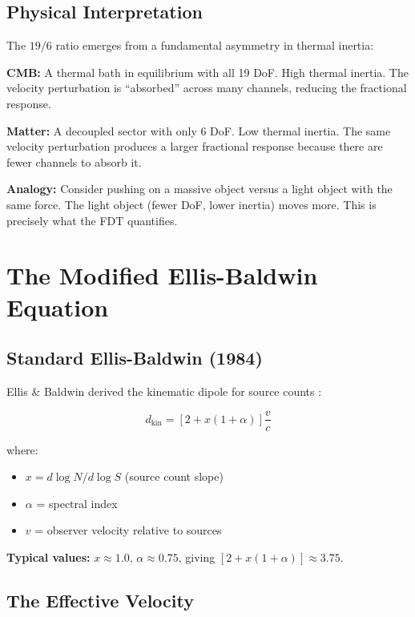 \documentclass[12pt,a4paper]{article}
\begin{document}
\subsection{Physical Interpretation}

The $19/6$ ratio emerges from a fundamental asymmetry in thermal inertia:

\textbf{CMB:} A thermal bath in equilibrium with all 19 DoF. High thermal inertia. The velocity perturbation is ``absorbed'' across many channels, reducing the fractional response.

\textbf{Matter:} A decoupled sector with only 6 DoF. Low thermal inertia. The same velocity perturbation produces a larger fractional response because there are fewer channels to absorb it.

\textbf{Analogy:} Consider pushing on a massive object versus a light object with the same force. The light object (fewer DoF, lower inertia) moves more. This is precisely what the FDT quantifies.

\section{The Modified Ellis-Baldwin Equation}

\subsection{Standard Ellis-Baldwin (1984)}

Ellis \& Baldwin derived the kinematic dipole for source counts \cite{ellis1984}:

\begin{equation}
d_{\text{kin}} = [2 + x(1+\alpha)] \frac{v}{c}
\end{equation}

where:
\begin{itemize}
    \item $x = d \log N / d \log S$ (source count slope)
    \item $\alpha$ = spectral index
    \item $v$ = observer velocity relative to sources
\end{itemize}

\textbf{Typical values:} $x \approx 1.0$, $\alpha \approx 0.75$, giving $[2 + x(1+\alpha)] \approx 3.75$.

\subsection{The Effective Velocity}
\end{document}

